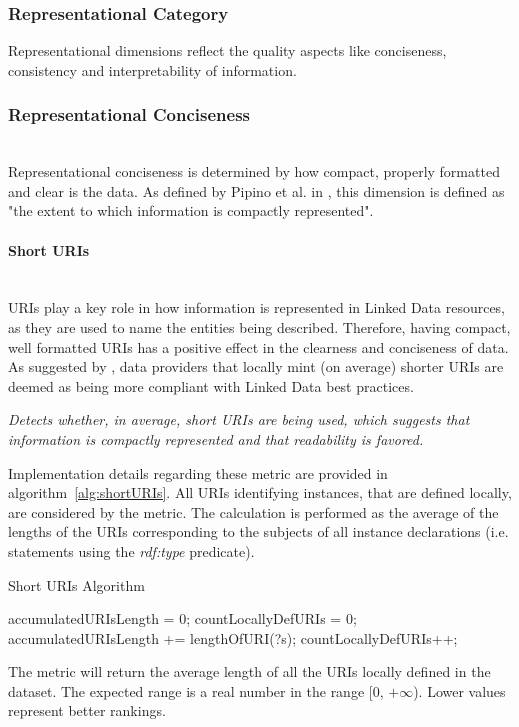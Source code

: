 
\subsubsection{Representational Category}
\label{sec:Representational} 

Representational dimensions reflect the quality aspects like conciseness, consistency and interpretability of information.

\subsubsection{Representational Conciseness}~\\ %
Representational conciseness is determined by how compact, properly formatted and clear is the data. As defined by Pipino et al. in \cite{Pipino2002}, this dimension is defined as "the extent to which information is compactly represented". 


\paragraph{Short URIs} ~\\
URIs play a key role in how information is represented in Linked Data resources, as they are used to name the entities being described. Therefore, having compact, well formatted URIs has a positive effect in the clearness and conciseness of data. 
As suggested by \cite{Hogan2012}, data providers that locally mint (on average) shorter URIs are deemed as being more compliant with Linked Data best practices.

\begin{mdframed}[style=metricdefinition]
\emph{Detects whether, in average, short URIs are being used, which suggests that information is compactly represented and that readability is favored.}
\end{mdframed}

Implementation details regarding these metric are provided in algorithm~\ref{alg:shortURIs}. All URIs identifying instances, that are defined locally, are considered by the metric. The calculation is performed as the average of the lengths of the URIs corresponding to the subjects of all instance declarations (i.e. statements using the \textit{rdf:type} predicate).
\begin{algorithm}
\caption{Short URIs Algorithm} \label{alg:shortURIs}
\begin{algorithmic}[1]
\State accumulatedURIsLength = 0;
\State countLocallyDefURIs = 0;
\EndProcedure
{}
\State accumulatedURIsLength += lengthOfURI(?s);
\State countLocallyDefURIs++;
\EndIf ~\\
\EndProcedure
\end{algorithmic}
\end{algorithm}
The metric will return the average length of all the URIs locally defined in the dataset. The expected range is a real number in the range [0, $+\infty$). Lower values represent better rankings.

